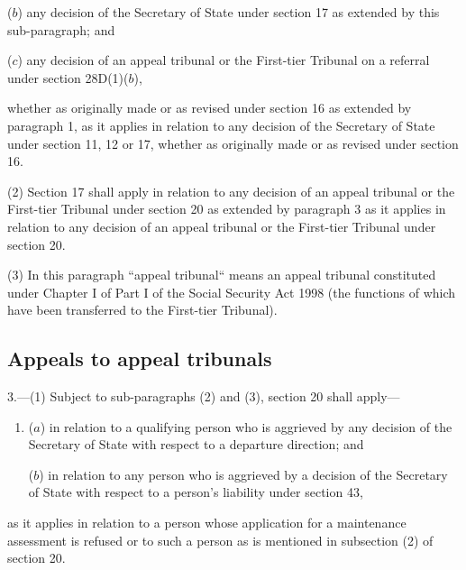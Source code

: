 \documentclass[a4paper]{article}
\begin{document}
{\begin{enumerate}
($b$) any decision of the Secretary of State under section 17 as extended by this sub-paragraph; and

($c$) any decision of 
an appeal tribunal or  %
the First-tier Tribunal on a referral under section 28D(1)($b$),
\end{enumerate}
whether as originally made or as revised under section 16 as extended by paragraph 1, as it applies in relation to any decision of the Secretary of State under section 11, 12 or 17, whether as originally made or as revised under section 16.

(2) Section 17 shall apply in relation to any decision of 
an appeal tribunal or  %
the First-tier Tribunal under section 20 as extended by paragraph 3 as it applies in relation to any decision of
an appeal tribunal or  %
the First-tier Tribunal under section 20.

(3) In this paragraph “appeal tribunal“ means an appeal tribunal constituted under Chapter I of Part I of the Social Security Act 1998 (the functions of which have been transferred to the First-tier Tribunal).


\subsection*{Appeals to appeal tribunals}

3.---(1) Subject to sub-paragraphs (2) and (3), section 20 shall apply---
\begin{enumerate}\item[]
($a$) in relation to a qualifying person who is aggrieved by any decision of the Secretary of State with respect to a departure direction; and

($b$) in relation to any person who is aggrieved by a decision of the Secretary of State%
%
{} with respect to a person’s liability under section 43,
\end{enumerate}
as it applies in relation to a person whose application for a maintenance assessment is refused or to such a person as is mentioned in subsection (2) of section 20.

}
\end{document}
